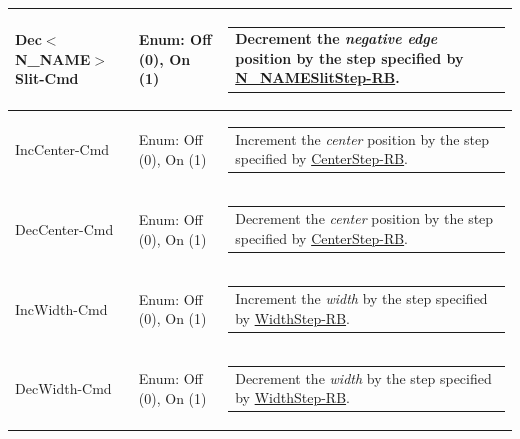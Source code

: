 \documentclass[openany]{article}
\begin{document}
\begin{longtable}{| m{4.5cm} m{2.5cm}  m{7.0cm} |}
        Dec$<$N\_NAME$>$Slit-Cmd & Enum: Off (0), On (1) & \begin{tabular}{@{}m{6cm}@{}}
                Decrement the \emph{negative edge} position by the step specified by \hyperlink{pv:negative-edge-step}{$<$N\_NAME$>$SlitStep-RB}.
            \end{tabular} \hypertarget{pv:inc-center-cmd}{}\\ \hline
        IncCenter-Cmd & Enum: Off (0), On (1) & \begin{tabular}{@{}m{6cm}@{}}
                Increment the \emph{center} position by the step specified by \hyperlink{pv:center-step}{CenterStep-RB}.
            \end{tabular} \hypertarget{pv:dec-center-cmd}{}\\ \hline
        DecCenter-Cmd & Enum: Off (0), On (1) & \begin{tabular}{@{}m{6cm}@{}}
                Decrement the \emph{center} position by the step specified by \hyperlink{pv:center-step}{CenterStep-RB}.
            \end{tabular} \hypertarget{pv:inc-width-cmd}{}\\ \hline
        IncWidth-Cmd & Enum: Off (0), On (1) & \begin{tabular}{@{}m{6cm}@{}}
                Increment the \emph{width} by the step specified by \hyperlink{pv:width-step}{WidthStep-RB}.
            \end{tabular} \hypertarget{pv:dec-width-cmd}{}\\ \hline
        DecWidth-Cmd & Enum: Off (0), On (1) & \begin{tabular}{@{}m{6cm}@{}}
                Decrement the \emph{width} by the step specified by \hyperlink{pv:width-step}{WidthStep-RB}.
            \end{tabular} \hypertarget{}{}\\ \hline
    \end{longtable}
\end{document}
